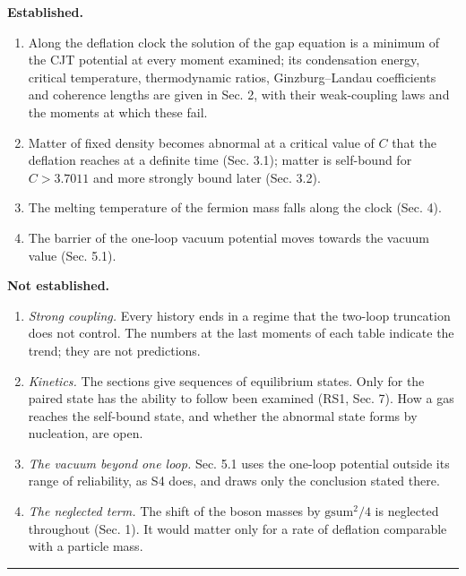 \documentclass[
  10pt,
]{article}
\providecommand{\tightlist}{%
  \setlength{\itemsep}{0pt}\setlength{\parskip}{0pt}}
\begin{document}
\textbf{Established.}

\begin{enumerate}
\def\labelenumi{\arabic{enumi}.}
\tightlist
\item
  Along the deflation clock the solution of the gap equation is a
  minimum of the CJT potential at every moment examined; its
  condensation energy, critical temperature, thermodynamic ratios,
  Ginzburg--Landau coefficients and coherence lengths are given in Sec.
  2, with their weak-coupling laws and the moments at which these fail.
\item
  Matter of fixed density becomes abnormal at a critical value of \(C\)
  that the deflation reaches at a definite time (Sec. 3.1); matter is
  self-bound for \(C>3.7011\) and more strongly bound later (Sec. 3.2).
\item
  The melting temperature of the fermion mass falls along the clock
  (Sec. 4).
\item
  The barrier of the one-loop vacuum potential moves towards the vacuum
  value (Sec. 5.1).
\end{enumerate}

\textbf{Not established.}

\begin{enumerate}
\def\labelenumi{\arabic{enumi}.}
\tightlist
\item
  \emph{Strong coupling.} Every history ends in a regime that the
  two-loop truncation does not control. The numbers at the last moments
  of each table indicate the trend; they are not predictions.
\item
  \emph{Kinetics.} The sections give sequences of equilibrium states.
  Only for the paired state has the ability to follow been examined
  (RS1, Sec. 7). How a gas reaches the self-bound state, and whether the
  abnormal state forms by nucleation, are open.
\item
  \emph{The vacuum beyond one loop.} Sec. 5.1 uses the one-loop
  potential outside its range of reliability, as S4 does, and draws only
  the conclusion stated there.
\item
  \emph{The neglected term.} The shift of the boson masses by
  \(\mathrm{gsum}^2/4\) is neglected throughout (Sec. 1). It would
  matter only for a rate of deflation comparable with a particle mass.
\end{enumerate}

\begin{center}\rule{0.5\linewidth}{0.5pt}\end{center}
\end{document}
